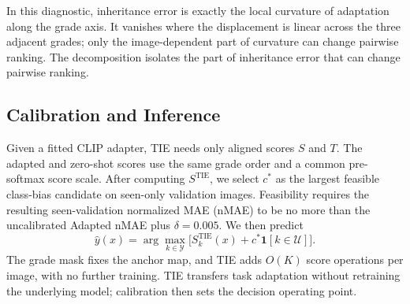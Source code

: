 In this diagnostic, inheritance error is exactly the local curvature of adaptation along the grade axis. It vanishes where the displacement is linear across the three adjacent grades; only the image-dependent part of curvature can change pairwise ranking. The decomposition isolates the part of inheritance error that can change pairwise ranking.

\subsection{Calibration and Inference}

Given a fitted CLIP adapter, TIE needs only aligned scores $S$ and $T$. The adapted and zero-shot scores use the same grade order and a common pre-softmax score scale. After computing $S^{\mathrm{TIE}}$, we select $c^*$ as the largest feasible class-bias candidate on seen-only validation images. Feasibility requires the resulting seen-validation normalized MAE (nMAE) to be no more than the uncalibrated Adapted nMAE plus $\delta=0.005$. We then predict
\begin{equation}
\label{eq:tie_prediction}
\hat y(x)=\arg\max_{k\in\mathcal Y}
\bigl[S_k^{\mathrm{TIE}}(x)+c^*\mathbf1[k\in\mathcal U]\bigr].
\end{equation}
The grade mask fixes the anchor map, and TIE adds $O(K)$ score operations per image, with no further training. TIE transfers task adaptation without retraining the underlying model; calibration then sets the decision operating point.
